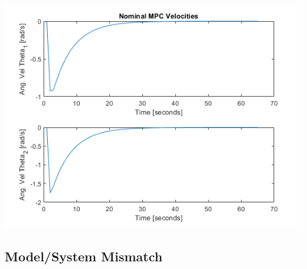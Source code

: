 \documentclass[journal]{IEEEtran}
\begin{document}
\includegraphics[scale = 0.5]{../images/Nominal_MPC/T4_X_init_220_25_0_0_X_ref_180_n45_0_0/AngularVelocities}





\subsection{Model/System Mismatch}

\subsection{}

\subsection{}

\subsection{}

\subsection{}

\subsection{}

\subsection{}
\end{document}
